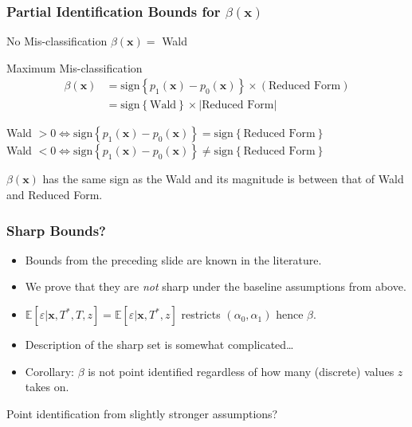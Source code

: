 \documentclass{beamer}
\begin{document}
\begin{frame}
  \frametitle{Partial Identification Bounds for $\beta(\mathbf{x})$}

    \begin{block}{No Mis-classification}
      $\beta(\mathbf{x}) = $ Wald 
    \end{block}

    \begin{block}{Maximum Mis-classification}
      \vspace{-1.5em}
      \begin{align*}
        \beta(\mathbf{x}) &=\mbox{sign}\left\{ p_1(\mathbf{x}) - p_0(\mathbf{x}) \right\}\times (\mbox{Reduced Form})\\
        &=\mbox{sign}\left\{ \mbox{Wald} \right\} \times |\mbox{Reduced Form}|
      \end{align*}
      
      \vspace{1em}
    \footnotesize Wald $> 0\iff \mbox{sign}\left\{ p_1(\mathbf{x}) - p_0(\mathbf{x}) \right\} = \mbox{sign}\left\{ \mbox{Reduced Form} \right\}$ \\
    \footnotesize Wald $< 0\iff \mbox{sign}\left\{ p_1(\mathbf{x}) - p_0(\mathbf{x}) \right\} \neq \mbox{sign}\left\{ \mbox{Reduced Form} \right\}$ 
    \end{block}

    \vspace{1em}
    \begin{alertblock}{
        $\beta(\mathbf{x})$ has the same sign as the Wald and its magnitude is between that of Wald and Reduced Form.}
    \end{alertblock}

\end{frame}
\begin{frame}
  \frametitle{Sharp Bounds?}

  \begin{itemize}
    \item Bounds from the preceding slide are known in the literature.
    \item We prove that they are \emph{not} sharp under the baseline assumptions from above.
      \item $\mathbb{E}[\varepsilon|\mathbf{x},T^*,T,z] = \mathbb{E}[\varepsilon|\mathbf{x},T^*,z]$ restricts $(\alpha_0,\alpha_1)$ hence $\beta$.
    \item Description of the sharp set is somewhat complicated\dots
    \item Corollary: $\beta$ is not point identified regardless of how many (discrete) values $z$ takes on.
  \end{itemize}

  \begin{alertblock}{Point identification from slightly stronger assumptions?}
  \end{alertblock}

\end{frame}
\end{document}
